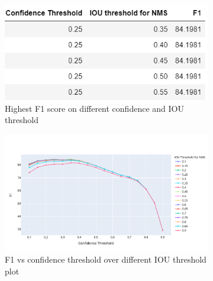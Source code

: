     

\begin{figure}[htbp]
  \centering
  \begin{subfigure}{0.5\textwidth}
    \includegraphics[width=\linewidth]{img/F1_vs_conf_table.png}
    \caption{Highest F1 score on different confidence and IOU threshold}
    \label{fig:F1_vs_conf_table}
  \end{subfigure}
   \begin{subfigure}{1.0\textwidth}
    \includegraphics[width=\linewidth]{img/F1_vs_conf_plot.pdf}
    \caption{F1 vs confidence threshold over different IOU threshold plot}
    \label{fig:F1_vs_conf_plot}
  \end{subfigure}
  \caption{}
  \label{fig:F1_vs_conf} %
\end{figure}